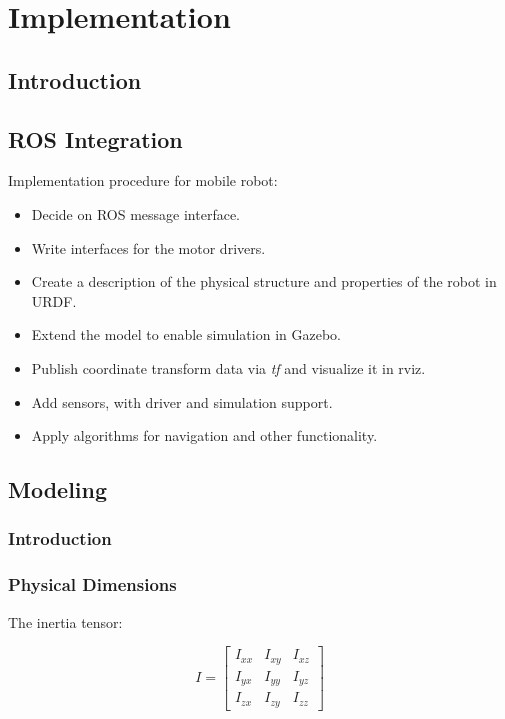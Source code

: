 \chapter{Implementation}
\label{chp:implementation} 

\section{Introduction}

\section{ROS Integration}

Implementation procedure for mobile robot:

\begin{itemize}

	\item Decide on ROS message interface.
	\item Write interfaces for the motor drivers.
	\item Create a description of the physical structure and properties of the robot in \ac{URDF}. 
	\item Extend the model to enable simulation in Gazebo.
	\item Publish coordinate transform data via \textit{tf} and visualize it in rviz.
	\item Add sensors, with driver and simulation support.
	\item Apply algorithms for navigation and other functionality. 

\end{itemize}

\section{Modeling}

\subsection{Introduction}



\subsection{Physical Dimensions}

The inertia tensor:

\begin{equation}
    	I = \begin{bmatrix}
    	I_{xx} & I_{xy} & I_{xz} \\[0.3em]
    	I_{yx} & I_{yy} & I_{yz} \\[0.3em]
    	I_{zx} & I_{zy} & I_{zz}
    	\end{bmatrix}
\end{equation}

